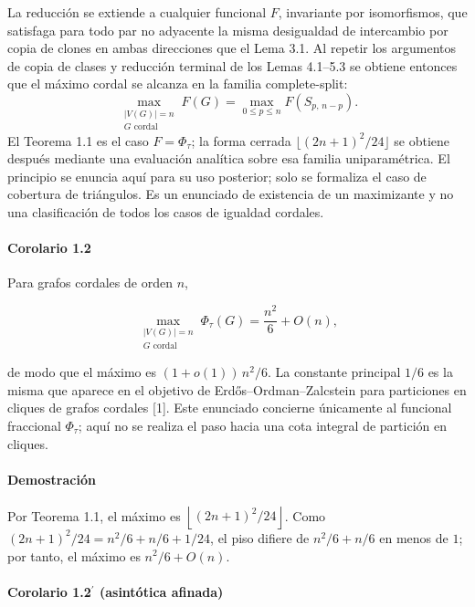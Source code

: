 \documentclass[
  spanish,
  11pt,
  a4paper,
]{article}
\begin{document}
La reducción se extiende a cualquier funcional \(F\), invariante por isomorfismos, que satisfaga para todo par no adyacente la misma desigualdad de intercambio por copia de clones en ambas direcciones que el Lema 3.1. Al repetir los argumentos de copia de clases y reducción terminal de los Lemas 4.1--5.3 se obtiene entonces que el máximo cordal se alcanza en la familia complete-split:
\[
\max_{\substack{|V(G)|=n\\ G\text{ cordal}}}F(G)=\max_{0\le p\le n}F(S_{p,\,n-p}).
\]
El Teorema 1.1 es el caso \(F=\Phi_\tau\); la forma cerrada \(\lfloor(2n+1)^2/24\rfloor\) se obtiene después mediante una evaluación analítica sobre esa familia uniparamétrica. El principio se enuncia aquí para su uso posterior; solo se formaliza el caso de cobertura de triángulos. Es un enunciado de existencia de un maximizante y no una clasificación de todos los casos de igualdad cordales.

\paragraph{Corolario 1.2}\label{corolario-1.2}

Para grafos cordales de orden \(n\),

\[
\max_{\substack{|V(G)|=n\\G\text{ cordal}}}\Phi_\tau(G)=\frac{n^2}{6}+O(n),
\]

de modo que el máximo es \((1+o(1))\,n^2/6\). La constante principal \(1/6\) es la misma que aparece en el objetivo de Erdős--Ordman--Zalcstein para particiones en cliques de grafos cordales {[}1{]}. Este enunciado concierne únicamente al funcional fraccional \(\Phi_\tau\); aquí no se realiza el paso hacia una cota integral de partición en cliques.

\paragraph{Demostración}\label{demostraciuxf3n}

Por Teorema 1.1, el máximo es \(\left\lfloor(2n+1)^2/24\right\rfloor\). Como \((2n+1)^2/24=n^2/6+n/6+1/24\), el piso difiere de \(n^2/6+n/6\) en menos de \(1\); por tanto, el máximo es \(n^2/6+O(n)\).

\paragraph{\texorpdfstring{Corolario 1.2\(^{\prime}\) (asintótica afinada)}{Corolario 1.2\^{}\{\textbackslash prime\} (asintótica afinada)}}\label{corolario-1.2prime-asintuxf3tica-afinada}
\end{document}

